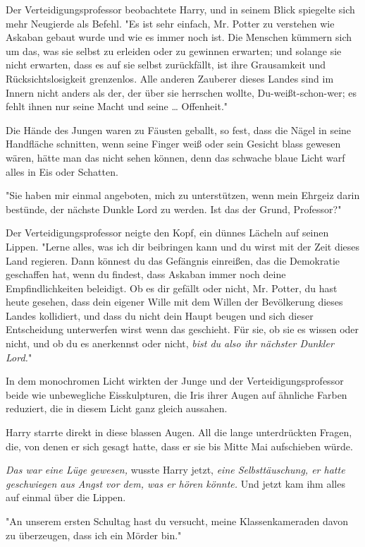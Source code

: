 {Der Verteidigungsprofessor beobachtete Harry, und in seinem Blick spiegelte sich mehr Neugierde als Befehl. "Es ist sehr einfach, Mr. Potter zu verstehen wie Askaban gebaut wurde und wie es immer noch ist. Die Menschen kümmern sich um das, was sie selbst zu erleiden oder zu gewinnen erwarten; und solange sie nicht erwarten, dass es auf sie selbst zurückfällt, ist ihre Grausamkeit und Rücksichtslosigkeit grenzenlos. Alle anderen Zauberer dieses Landes sind im Innern nicht anders als der, der über sie herrschen wollte, Du-weißt-schon-wer; es fehlt ihnen nur seine Macht und seine … Offenheit."

Die Hände des Jungen waren zu Fäusten geballt, so fest, dass die Nägel in seine Handfläche schnitten, wenn seine Finger weiß oder sein Gesicht blass gewesen wären, hätte man das nicht sehen können, denn das schwache blaue Licht warf alles in Eis oder Schatten.

"Sie haben mir einmal angeboten, mich zu unterstützen, wenn mein Ehrgeiz darin bestünde, der nächste Dunkle Lord zu werden. Ist das der Grund, Professor?"

Der Verteidigungsprofessor neigte den Kopf, ein dünnes Lächeln auf seinen Lippen. "Lerne alles, was ich dir beibringen kann und du wirst mit der Zeit dieses Land regieren. Dann könnest du das Gefängnis einreißen, das die Demokratie geschaffen hat, wenn du findest, dass Askaban immer noch deine Empfindlichkeiten beleidigt. Ob es dir gefällt oder nicht, Mr. Potter, du hast heute gesehen, dass dein eigener Wille mit dem Willen der Bevölkerung dieses Landes kollidiert, und dass du nicht dein Haupt beugen und sich dieser Entscheidung unterwerfen wirst wenn das geschieht. Für sie, ob sie es wissen oder nicht, und ob du es anerkennst oder nicht, \emph{bist du also ihr nächster Dunkler Lord.}"

In dem monochromen Licht wirkten der Junge und der Verteidigungsprofessor beide wie unbewegliche Eisskulpturen, die Iris ihrer Augen auf ähnliche Farben reduziert, die in diesem Licht ganz gleich aussahen.

Harry starrte direkt in diese blassen Augen. All die lange unterdrückten Fragen, die, von denen er sich gesagt hatte, dass er sie bis Mitte Mai aufschieben würde.

\emph{Das war eine Lüge gewesen,} wusste Harry jetzt, \emph{eine Selbsttäuschung, er hatte geschwiegen aus Angst vor dem, was er hören könnte.} Und jetzt kam ihm alles auf einmal über die Lippen.

"An unserem ersten Schultag hast du versucht, meine Klassenkameraden davon zu überzeugen, dass ich ein Mörder bin."

}
